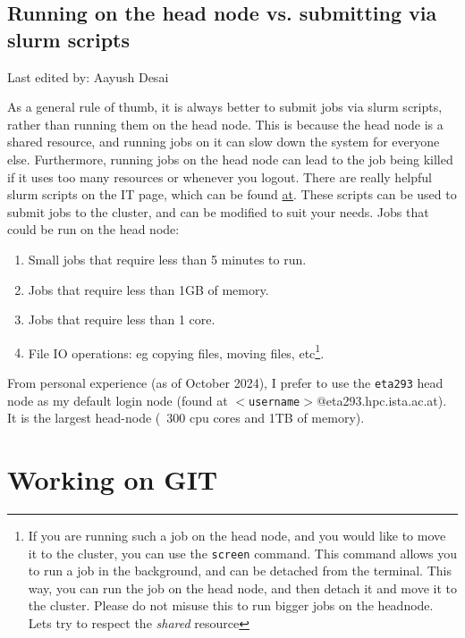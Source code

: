 \documentclass{article}
\newcommand{\setlasteditor}[1]{\gdef\lasteditor{#1}}
\newcommand{\lastedited}{%
    \vspace{1mm} {\footnotesize Last edited by: \lasteditor} \vspace{3mm}
    \newline

}
\begin{document}
\subsection{Running on the head node vs. submitting via slurm scripts}
\setlasteditor{Aayush Desai}
\lastedited
\noindent
As a general rule of thumb, it is always better to submit jobs via slurm scripts, rather than running them on the head node. This is because the head node is a shared resource, and running jobs on it can slow down the system for everyone else. Furthermore, running jobs on the head node can lead to the job being killed if it uses too many resources or whenever you logout. 
\newline
\newline
There are really helpful slurm scripts on the IT page, which can be found \href{https://it.pages.ist.ac.at/docs/hpc-cluster/hpc-handbook/composing-a-slurm-script/}{at}. These scripts can be used to submit jobs to the cluster, and can be modified to suit your needs.
\newline
\newline
\noindent
Jobs that could be run on the head node:
\begin{enumerate}
    \item Small jobs that require less than 5 minutes to run.
    \item Jobs that require less than 1GB of memory.
    \item Jobs that require less than 1 core.
    \item File IO operations: eg copying files, moving files, etc\footnote{If you are running such a job on the head node, and you would like to move it to the cluster, you can use the \texttt{screen} command. This command allows you to run a job in the background, and can be detached from the terminal. This way, you can run the job on the head node, and then detach it and move it to the cluster. Please do not misuse this to run bigger jobs on the headnode. Lets try to respect the \textit{shared} resource}.
\end{enumerate}
\noindent
From personal experience (as of October 2024), I prefer to use the \texttt{eta293} head node as my default login node (found at \texttt{$<$username$>$}@eta293.hpc.ista.ac.at). It is the largest head-node (~300 cpu cores and 1TB of memory).

\section{Working on GIT}
\newpage %
\end{document}
